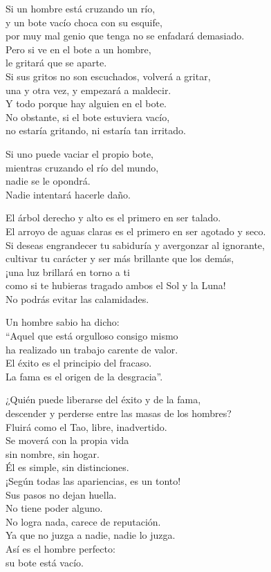 \documentclass[hidelinks]{memoir}
\begin{document}
	Si un hombre está cruzando un río,\\
	y un bote vacío choca con su esquife,\\
	por muy mal genio que tenga no se enfadará demasiado.\\
	Pero si ve en el bote a un hombre,\\
	le gritará que se aparte.\\
	Si sus gritos no son escuchados, volverá a gritar,\\
	una y otra vez, y empezará a maldecir.\\
	Y todo porque hay alguien en el bote.\\
	No obstante, si el bote estuviera vacío,\\
	no estaría gritando, ni estaría tan irritado.
	
	Si uno puede vaciar el propio bote,\\
	mientras cruzando el río del mundo,\\
	nadie se le opondrá.\\
	Nadie intentará hacerle daño.
	
	El árbol derecho y alto es el primero en ser talado.\\
	El arroyo de aguas claras es el primero en ser agotado y seco.\\
	Si deseas engrandecer tu sabiduría y avergonzar al ignorante,\\
	cultivar tu carácter y ser más brillante que los demás,\\
	¡una luz brillará en torno a ti\\
	como si te hubieras tragado ambos el Sol y la Luna!\\
	No podrás evitar las calamidades.
	
	Un hombre sabio ha dicho:\\
	``Aquel que está orgulloso consigo mismo\\
	ha realizado un trabajo carente de valor.\\
	El éxito es el principio del fracaso.\\
	La fama es el origen de la desgracia''.
	
	¿Quién puede liberarse del éxito y de la fama,\\
	descender y perderse entre las masas de los hombres?\\
	Fluirá como el Tao, libre, inadvertido.\\
	Se moverá con la propia vida\\
	sin nombre, sin hogar.\\
	Él es simple, sin distinciones.\\
	¡Según todas las apariencias, es un tonto!\\
	Sus pasos no dejan huella.\\
	No tiene poder alguno.\\
	No logra nada, carece de reputación.\\
	Ya que no juzga a nadie, nadie lo juzga.\\
	Así es el hombre perfecto:\\
	su bote está vacío.
	
\end{document}
